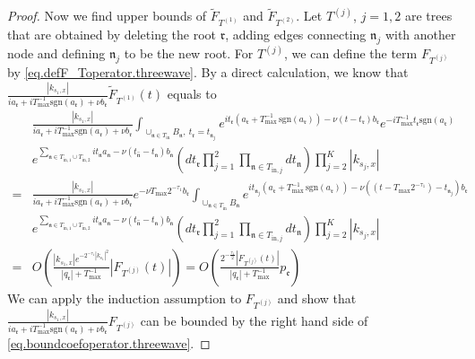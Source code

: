 \begin{proof}
Now we find upper bounds of $\widetilde{F}_{T^{(1)}}$ and $\widetilde{F}_{T^{(2)}}$. Let $T^{(j)}$, $j=1,2$ are trees that are obtained by deleting the root $\mathfrak{r}$, adding edges connecting $\mathfrak{n}_j$ with another node and defining $\mathfrak{n}_j$ to be the new root. For $T^{(j)}$, we can define the term $F_{T^{(j)}}$ by \eqref{eq.defF_Toperator.threewave}. By a direct calculation, we know that $\frac{|k_{s_1,x}|}{ia_{\mathfrak{r}}+iT^{-1}_{\text{max}} \text{sgn}(a_{\mathfrak{r}})+\nu b_{\mathfrak{r}} }\widetilde{F}_{T^{(1)}}(t)$ equals to
\begin{equation}
    \begin{split}
        &\frac{|k_{s_1,x}|}{ia_{\mathfrak{r}}+iT^{-1}_{\text{max}} \text{sgn}(a_{\mathfrak{r}})+\nu b_{\mathfrak{r}} } \int_{\cup_{\mathfrak{n}\in T_{\text{in}}} B_{\mathfrak{n}},\ t_{\mathfrak{r}}=t_{\mathfrak{n}_j}} e^{it_{\mathfrak{r}}(a_{\mathfrak{r}}+T^{-1}_{\text{max}}\, \text{sgn}(a_{\mathfrak{r}}))- \nu(t-t_{\mathfrak{r}})b_{\mathfrak{r}}} e^{-iT^{-1}_{\text{max}}t_{\mathfrak{r}} \text{sgn}(a_{\mathfrak{r}})} 
        \\
        &e^{\sum_{\mathfrak{n}\in T_{\text{in},1}\cup T_{\text{in},2}} it_{\mathfrak{n}} a_{\mathfrak{n}} - \nu(t_{\widehat{\mathfrak{n}}}-t_{\mathfrak{n}})b_{\mathfrak{n}}} \left(dt_{\mathfrak{r}}\prod_{j=1}^2\prod_{\mathfrak{n}\in T_{\text{in},j}}dt_{\mathfrak{n}}  \right)\prod^K_{j=2}|k_{s_j,x}|
        \\
        =&\frac{|k_{s_1,x}|}{ia_{\mathfrak{r}}+iT^{-1}_{\text{max}} \text{sgn}(a_{\mathfrak{r}})+\nu b_{\mathfrak{r}} }  e^{- \nu T_{\text{max}} 2^{-\tau_{1}}b_{\mathfrak{r}}}\int_{\cup_{\mathfrak{n}\in T_{\text{in}}} B_{\mathfrak{n}}} e^{it_{\mathfrak{n}_j}(a_{\mathfrak{r}}+T^{-1}_{\text{max}}\, \text{sgn}(a_{\mathfrak{r}}))- \nu((t-T_{\text{max}} 2^{-\tau_{1}})-t_{\mathfrak{n}_j})b_{\mathfrak{r}}}
        \\
        &  e^{\sum_{\mathfrak{n}\in T_{\text{in},1}\cup T_{\text{in},2}} it_{\mathfrak{n}} a_{\mathfrak{n}} - \nu(t_{\widehat{\mathfrak{n}}}-t_{\mathfrak{n}})b_{\mathfrak{n}}}\left(dt_{\mathfrak{r}}\prod_{j=1}^2\prod_{\mathfrak{n}\in T_{\text{in},j}}dt_{\mathfrak{n}}  \right)\prod^K_{j=2}|k_{s_j,x}|
        \\
        =&O\left(\frac{|k_{s_1,x}|e^{- 2^{-\tau_{1}}|k_{s_1}|^2} }{|q_{\mathfrak{r}}|+T^{-1}_{\text{max}}} |F_{T^{(j)}}(t)|\right)=O\left(\frac{2^{-\frac{\tau_{1}}{2}}|F_{T^{(j)}}(t)| }{|q_{\mathfrak{r}}|+T^{-1}_{\text{max}}}p_{\mathfrak{e}}\right)
    \end{split}
\end{equation}
We can apply the induction assumption to $F_{T^{(j)}}$ and show that $\frac{|k_{s_1,x}|}{ia_{\mathfrak{r}}+iT^{-1}_{\text{max}} \text{sgn}(a_{\mathfrak{r}})+\nu b_{\mathfrak{r}} } F_{T^{(j)}}$ can be bounded by the right hand side of \eqref{eq.boundcoefoperator.threewave}.



\end{proof}
